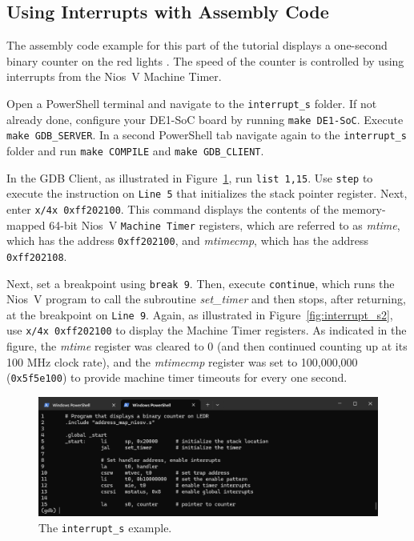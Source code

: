 \documentclass[11pt, twoside, pdftex]{article}
\newcommand{\red}[1]{{\color{red}\sf{#1}}}
\begin{document}
\subsection{Using Interrupts with Assembly Code}

The assembly code example for this part of the tutorial displays a one-second binary counter on 
the red lights \red{{\it LEDR}}. The speed of the counter is controlled by using interrupts from 
the Nios~V Machine Timer.  

Open a PowerShell terminal and navigate to the \texttt{interrupt\_s} folder.
If not already done, configure your DE1-SoC board by running \texttt{make DE1-SoC}. Execute 
\texttt{make GDB\_SERVER}. In a second PowerShell tab navigate again to the 
\texttt{interrupt\_s} folder and run \texttt{make COMPILE} and \texttt{make GDB\_CLIENT}.

In the GDB Client, as illustrated in Figure~\ref{fig:interrupt_s1}, run \texttt{list 1,15}. 
Use \texttt{step} to execute the instruction on \texttt{Line 5} that initializes the stack pointer
register. Next, enter \texttt{x/4x 0xff202100}. This command displays the contents 
of the memory-mapped 64-bit Nios~V \texttt{Machine Timer} registers, which are referred to as 
{\it mtime}, which has the address \texttt{0xff202100}, and {\it mtimecmp}, which has the
address \texttt{0xff202108}.

Next, set a breakpoint using \texttt{break 9}. Then, execute \texttt{continue}, which runs the
Nios~V program to call the subroutine {\it set\_timer} and then stops, after returning, at 
the breakpoint on \texttt{Line 9}. Again, as illustrated in Figure~\ref{fig:interrupt_s2}, use 
\texttt{x/4x~0xff202100} to display the Machine Timer registers. As indicated in the figure, 
the {\it mtime} register was cleared to 0 (and then continued counting up at its 100 MHz clock 
rate), and the {\it mtimecmp} register was set to 100,000,000 (\texttt{0x5f5e100}) to
provide machine timer timeouts for every one second.  

\begin{figure}[h]
    \begin{center}
        \includegraphics[scale=.6]{figures/interrupt_s1.png}
        \caption{The \texttt{interrupt\_s} example.}
        \label{fig:interrupt_s1}
    \end{center}
\end{figure}
\end{document}
